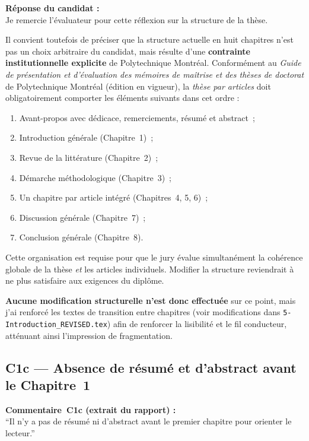 \documentclass[12pt,a4paper]{article}
\newcommand{\Commentaire}[2]{%
  \begin{reviewerbox}
    \textbf{Commentaire~#1 (extrait du rapport) :}\\#2
  \end{reviewerbox}%
}
\newcommand{\Reponse}[1]{%
  \begin{responsebox}
    \textbf{Réponse du candidat :}\\#1
  \end{responsebox}%
}
\begin{document}
\Reponse{
Je remercie l'évaluateur pour cette réflexion sur la structure de la thèse.

Il convient toutefois de préciser que la structure actuelle en huit chapitres n'est pas un choix arbitraire du candidat, mais résulte d'une \textbf{contrainte institutionnelle explicite} de Polytechnique Montréal. Conformément au \emph{Guide de présentation et d'évaluation des mémoires de maîtrise et des thèses de doctorat} de Polytechnique Montréal (édition en vigueur), la \emph{thèse par articles} doit obligatoirement comporter les éléments suivants dans cet ordre :
\begin{enumerate}[leftmargin=*, label=(\roman*)]
  \item Avant-propos avec dédicace, remerciements, résumé et abstract~;
  \item Introduction générale (Chapitre~1)~;
  \item Revue de la littérature (Chapitre~2)~;
  \item Démarche méthodologique (Chapitre~3)~;
  \item Un chapitre par article intégré (Chapitres~4, 5, 6)~;
  \item Discussion générale (Chapitre~7)~;
  \item Conclusion générale (Chapitre~8).
\end{enumerate}
Cette organisation est requise pour que le jury évalue simultanément la cohérence globale de la thèse \emph{et} les articles individuels. Modifier la structure reviendrait à ne plus satisfaire aux exigences du diplôme.

\textbf{Aucune modification structurelle n'est donc effectuée} sur ce point, mais j'ai renforcé les textes de transition entre chapitres (voir modifications dans \texttt{5-Introduction\_REVISED.tex}) afin de renforcer la lisibilité et le fil conducteur, atténuant ainsi l'impression de fragmentation.
}

\subsection*{C1c --- Absence de résumé et d'abstract avant le Chapitre~1}

\Commentaire{C1c}{
  ``Il n'y a pas de résumé ni d'abstract avant le premier chapitre pour orienter le lecteur.''
}
\end{document}

